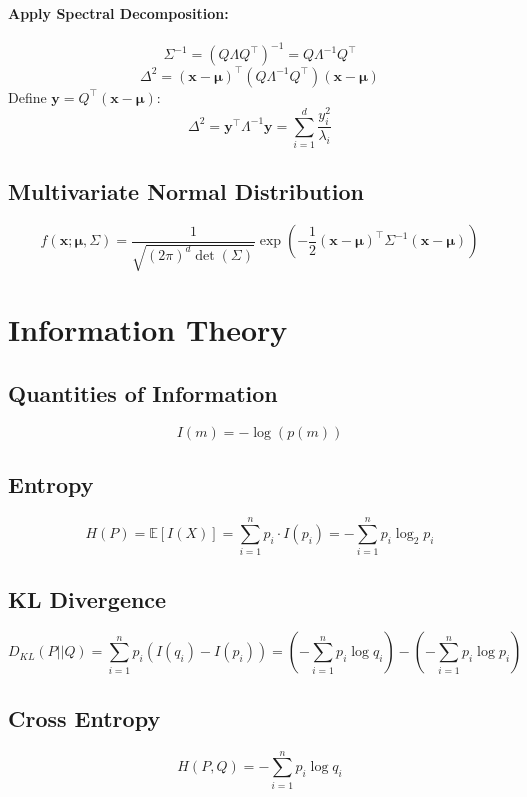 \documentclass{article}
\begin{document}
\paragraph{Apply Spectral Decomposition:}
\[
    \Sigma^{-1} = (Q \Lambda Q^\top)^{-1} = Q \Lambda^{-1} Q^\top
\]
\[
    \Delta^2 = (\mathbf{x} - \boldsymbol{\mu})^\top (Q \Lambda^{-1} Q^\top) (\mathbf{x} - \boldsymbol{\mu})
\]
Define \( \mathbf{y} = Q^\top (\mathbf{x} - \boldsymbol{\mu}) \):
\[
    \Delta^2 = \mathbf{y}^\top \Lambda^{-1} \mathbf{y} = \sum_{i=1}^{d} \frac{y_i^2}{\lambda_i}
\]

\subsection{Multivariate Normal Distribution}
\[
    f(\mathbf{x}; \boldsymbol{\mu}, \Sigma) = \frac{1}{\sqrt{(2\pi)^d\det(\Sigma)}} \exp\left(-\frac{1}{2}(\mathbf{x} - \boldsymbol{\mu})^\top \Sigma^{-1} (\mathbf{x} - \boldsymbol{\mu})\right)
\]


\newpage
\section{Information Theory}

\subsection{Quantities of Information}
\[
    I(m) = -\log(p(m))
\]

\subsection{Entropy}
\[
    H(P) = \mathbb{E}[I(X)] = \sum_{i=1}^{n} p_i \cdot I(p_i) = -\sum_{i=1}^{n} p_i \log_2 p_i
\]

\subsection{KL Divergence}
\[
    D_{KL}(P||Q) = \sum_{i=1}^{n} p_i (I(q_i) - I(p_i)) = (-\sum_{i=1}^{n} p_i \log q_i) - (-\sum_{i=1}^{n} p_i \log p_i)
\]

\subsection{Cross Entropy}
\[
    H(P, Q) = -\sum_{i=1}^{n} p_i \log q_i
\]
\end{document}

